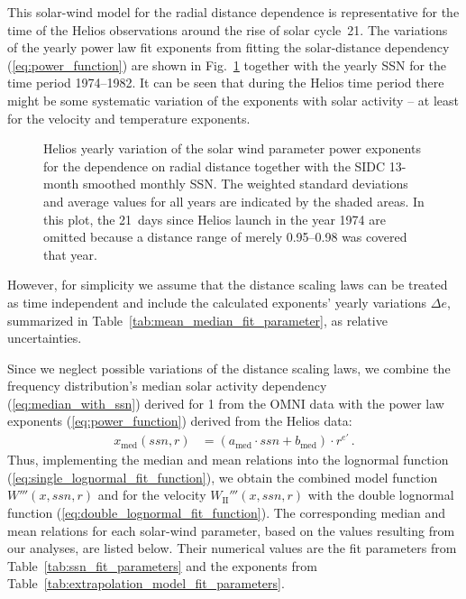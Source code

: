\documentclass[]{aa}
\begin{document}
        This solar-wind model for the radial distance dependence is representative for the time of the Helios observations around the rise of solar cycle~21. The variations of the yearly power law fit exponents from fitting the solar-distance dependency (\ref{eq:power_function}) are shown in Fig.~\ref{fig:yearly_gradients_c} together with the yearly SSN for the time period \numrange{1974}{1982}. It can be seen that during the Helios time period there might be some systematic  variation of the exponents with solar activity -- at least for the velocity and temperature exponents.
        \begin{figure}
                         \caption{Helios yearly variation of the solar wind parameter power exponents for the dependence on radial distance together with the SIDC 13-month smoothed monthly SSN. The weighted standard deviations and average values for all years are indicated by the shaded areas. In this plot, the 21~days since Helios launch in the year 1974 are omitted because a distance range of merely \SIrange{0.95}{0.98}{\au} was covered that year.}
                \label{fig:yearly_gradients_c}
        \end{figure}
        However, for simplicity we assume that the distance scaling laws can be treated as time independent and include the calculated exponents’ yearly variations $\Delta e$, summarized in Table~\ref{tab:mean_median_fit_parameter}, as relative uncertainties.

        Since we neglect possible variations of the distance scaling laws, we combine the frequency distribution’s median solar activity dependency (\ref{eq:median_with_ssn}) derived for \SI{1}{\au} from the OMNI data with the power law exponents (\ref{eq:power_function}) derived from the Helios data:
        \begin{align}
                x_\text{med}(ssn,r) &= \left(a_\text{med} \cdot ssn + b_\text{med}\right) \cdot r^{e'}    \,.     \label{eq:general_sw_model}
        \end{align}
        Thus, implementing the median and mean relations into the lognormal function (\ref{eq:single_lognormal_fit_function}), we obtain the combined model function $W'''(x,ssn,r)$ and for the velocity $W_\text{II}'''(x,ssn,r)$ with the double lognormal function (\ref{eq:double_lognormal_fit_function}). The corresponding median and mean relations for each solar-wind parameter, based on the values resulting from our analyses, are listed below. Their numerical values are the fit parameters from Table~\ref{tab:ssn_fit_parameters} and the exponents from Table~\ref{tab:extrapolation_model_fit_parameters}.
\end{document}
